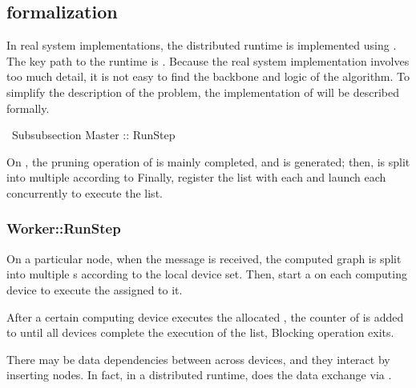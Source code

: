 \begin{content}
\subsection{formalization}

In real system implementations, the distributed runtime is implemented using . The key path to the \tf{} runtime is . Because the real system implementation involves too much detail, it is not easy to find the backbone and logic of the algorithm. To simplify the description of the problem, the implementation of  will be described formally.

\ Subsubsection {Master :: RunStep}

On , the pruning operation of  is mainly completed, and  is generated; then,  is split into multiple  according to  Finally, register the  list with each  and launch each  concurrently to execute the  list.


\subsubsection{Worker::RunStep}

On a particular  node, when the  message is received, the computed graph is split into multiple s according to the local device set. Then, start a  on each computing device to execute the  assigned to it.

After a certain computing device executes the allocated , the counter of  is added to  until all devices complete the execution of the  list,  Blocking operation exits.

There may be data dependencies between  across devices, and they interact by inserting  nodes. In fact, in a distributed runtime,  does the data exchange via .


\end{content}
